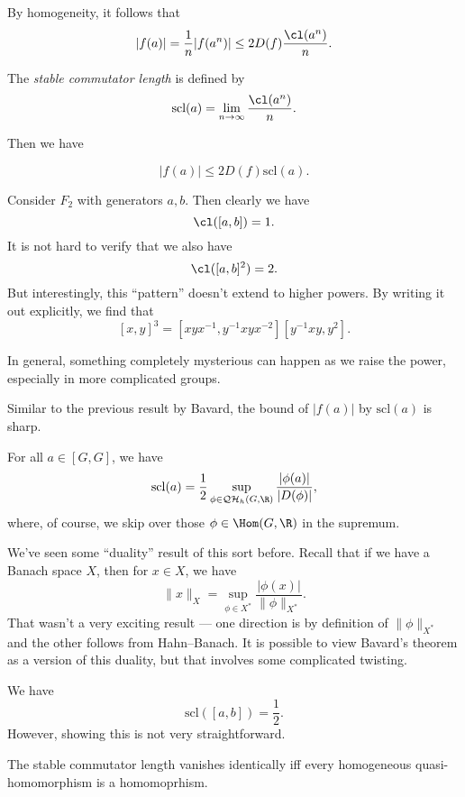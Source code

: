 \documentclass[a4paper]{article}
\newcommand\QH{\mathcal{QH}}
\newcommand\scl{\mathrm{scl}}
\newcommand\Free{F}
\begin{document}
By homogeneity, it follows that
\[
  |f(a)| = \frac{1}{n} |f(a^n)| \leq 2 D(f) \frac{\cl(a^n)}{n}.
\]

\begin{defi}
  The \emph{stable commutator length} is defined by
  \[
    \scl(a) = \lim_{n \to \infty} \frac{\cl(a^n)}{n}.
  \]
\end{defi}

Then we have
\begin{prop}
  \[
    |f(a)| \leq 2 D(f) \scl(a).
  \]
\end{prop}

\begin{eg}
  Consider $\Free_2$ with generators $a, b$. Then clearly we have
  \[
    \cl([a, b]) = 1.
  \]
  It is not hard to verify that we also have
  \[
    \cl([a, b]^2) = 2.
  \]
  But interestingly, this ``pattern'' doesn't extend to higher powers. By writing it out explicitly, we find that
  \[
    [x, y]^3 = [xyx^{-1}, y^{-1} xyx^{-2}] [y^{-1}xy, y^2].
  \]
\end{eg}
In general, something completely mysterious can happen as we raise the power, especially in more complicated groups.

Similar to the previous result by Bavard, the bound of $|f(a)|$ by $\scl(a)$ is sharp.
\begin{thm}[Bavard, 1992]
  For all $a \in [G, G]$, we have
  \[
    \scl(a) = \frac{1}{2} \sup_{\phi \in \QH_h(G, \R)} \frac{|\phi(a)|}{|D(\phi)|},
  \]
  where, of course, we skip over those $\phi \in \Hom(G, \R)$ in the supremum.
\end{thm}
We've seen some ``duality'' result of this sort before. Recall that if we have a Banach space $X$, then for $x \in X$, we have
\[
  \|x\|_X = \sup_{\phi \in X^*} \frac{|\phi(x)|}{\|\phi\|_{X^*}}.
\]
That wasn't a very exciting result --- one direction is by definition of $\|\phi\|_{X^*}$ and the other follows from Hahn--Banach. It is possible to view Bavard's theorem as a version of this duality, but that involves some complicated twisting.

\begin{eg}
  We have
  \[
    \scl([a, b]) = \frac{1}{2}.
  \]
  However, showing this is not very straightforward.
\end{eg}

\begin{cor}
  The stable commutator length vanishes identically iff every homogeneous quasi-homomorphism is a homomoprhism.
\end{cor}
\end{document}
